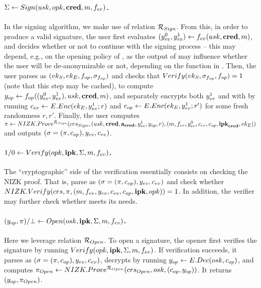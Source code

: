 \paragraph{$\Sigma \gets Sign(usk,opk,\mathbf{cred},m,f_{ev})$.} %
In the signing algorithm, we make use of relation $\mathcal{R}_{Sign}$.
% 
From this, in order to produce a valid signature, the user first evaluates
$(y_{ev}^0,y_{ev}^1) \gets f_{ev} (usk,\mathbf{cred},m)$, and decides whether or
not to continue with the signing process -- this may depend, e.g., on the
opening policy of \opk, as the output of \feval may influence whether the user
will be de-anonymizable or not, depending on the \finsp function in \opk.
%
Then, the user parses \opk as $(vk_{S},ek_{E},f_{op},\sigma_{f_{op}})$ and checks that
$Verify(vk_{S},\sigma_{f_{op}},f_{op}) = 1$ (note that this step may be cached), to
compute $y_{op} \gets f_{op}((y_{ev}^0,y_{ev}^1),usk,\mathbf{cred},m)$, and
separately encrypts both $y_{ev}^1$ and \yinsp with \Eek by running
$c_{ev} \gets E.Enc(ek_{E},y_{ev}^1;r)$ and $c_{op} \gets E.Enc(ek_{E},y_{ev}^1;
r')$ for some fresh randomness $r,r'$. Finally, the user computes
$\pi \gets NIZK.Prove^{\mathcal{R}_{Sign}}(crs_{Sign},(usk,\mathbf{cred},
\mathbf{a}_{\mathbf{cred}},y_{ev}^1,y_{op},r),(m,f_{ev},y_{ev}^0,c_{ev},c_{op},
\mathbf{ipk}_{\mathbf{cred}},ek_{E}))$ and outputs $(\sigma = (\pi,c_{op}),y_{ev},
c_{ev})$.

\paragraph{$1/0 \gets Verify(opk,\mathbf{ipk},\Sigma,m,f_{ev})$.} %
The ``cryptographic'' side of the verification essentially consists on checking
the NIZK proof. That is, parse \Sig as $(\sigma = (\pi,c_{op}),y_{ev},
c_{ev})$ and check whether $NIZK.Verify(crs,\pi,(m,f_{ev},y_{ev},
c_{ev},c_{op},\mathbf{ipk},opk)) = 1$. In addition, the verifier may further check
whether \yeval meets its needs.

\paragraph{$(y_{op},\pi)/\bot \gets
  Open(osk,\mathbf{ipk},\Sigma,m,f_{ev})$.} %
Here we leverage relation $\mathcal{R}_{Open}$.
%
To open a signature, the opener first verifies the signature by running $Verify
(opk,\mathbf{ipk}, \Sigma,m,f_{ev})$. If verification succeeds, it parses
\Sig as $(\sigma=(\pi,c_{op}),y_{ev},c_{ev})$, decrypts \Ec by running $y_{op}
\gets E.Dec(osk,c_{op})$, and computes $\pi_{Open} \gets
NIZK.Prove^{\mathcal{R}_{Open}}(crs_{Open},osk,(c_{op},y_{op}))$. It
returns $(y_{op},\pi_{Open})$.

